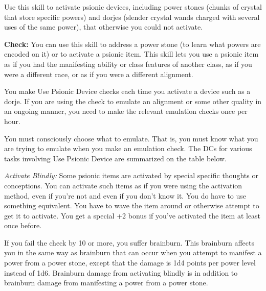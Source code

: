 Use this skill to activate psionic devices, including power stones (chunks of crystal that store specific powers) and dorjes (slender crystal wands charged with several uses of the same power), that otherwise you could not activate.

\textbf{Check:} You can use this skill to address a power stone (to learn what powers are encoded on it) or to activate a psionic item. This skill lets you use a psionic item as if you had the manifesting ability or class features of another class, as if you were a different race, or as if you were a different alignment.

You make Use Psionic Device checks each time you activate a device such as a dorje. If you are using the check to emulate an alignment or some other quality in an ongoing manner, you need to make the relevant emulation checks once per hour.

You must consciously choose what to emulate. That is, you must know what you are trying to emulate when you make an emulation check. The DCs for various tasks involving Use Psionic Device are summarized on the table below.


\textit{Activate Blindly:} Some psionic items are activated by special specific thoughts or conceptions. You can activate such items as if you were using the activation method, even if you’re not and even if you don’t know it. You do have to use something equivalent. You have to wave the item around or otherwise attempt to get it to activate. You get a special +2 bonus if you’ve activated the item at least once before.

If you fail the check by 10 or more, you suffer brainburn. This brainburn affects you in the same way as brainburn that can occur when you attempt to manifest a power from a power stone, except that the damage is 1d4 points per power level instead of 1d6. Brainburn damage from activating blindly is in addition to brainburn damage from manifesting a power from a power stone.

